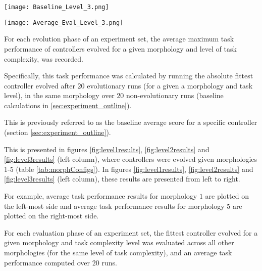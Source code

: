 \begin{figure*}[t]
	\begin{minipage}{0.5\textwidth}
		\texttt{[image: Baseline\_Level\_3.png]}
	\end{minipage}
	\begin{minipage}{0.5\textwidth}
		\texttt{[image: Average\_Eval\_Level\_3.png]}
	\end{minipage}
\caption{\textit{Left column:} Baseline task performance for evolved controllers (\textit{task level 1})
given morphologies $1-5$ (depicted from left to right).
\textit{Right column:} Average task performance given the fittest controller evolved
for each respective morphology ($1-5$, shown left to right) evaluated across all other morphologies.
For example: Left-most plot is average task performance of fittest controller evolved for
morphology $1$, evaluated across morphologies $2-5$.  Right-most plot is the average task performance
of fittest controller evolved for morphology $5$, evaluated across morphologies $1-4$.}\label{fig:level3results}
\end{figure*}


For each evolution phase of an experiment set, the average maximum task performance
of controllers evolved for a given morphology and level of task complexity, was recorded.

Specifically, this task performance was calculated by running the absolute fittest controller
evolved after $20$ evolutionary runs (for a given a morphology and task level),
in the same morphology over $20$ non-evolutionary runs (baseline calculations in \ref{sec:experiment_outline}).

This is previously referred to as the baseline average score for a specific controller (section \ref{sec:experiment_outline}).

This is presented in figures \ref{fig:level1results}, \ref{fig:level2results} and \ref{fig:level3results}
(left column), where controllers were evolved given morphologies $1$-$5$ (table \ref{tab:morphConfigs}).
In figures \ref{fig:level1results}, \ref{fig:level2results} and \ref{fig:level3results} (left column),
these results are presented from left to right.

For example, average task performance results for morphology $1$ are plotted on the left-most side
and average task performance results for morphology $5$ are plotted on the right-most side.

For each evaluation phase of an experiment set, the fittest controller evolved for a given morphology and task complexity
level was evaluated across all other morphologies (for the same level of task complexity), and an
average task performance computed over $20$ runs.

